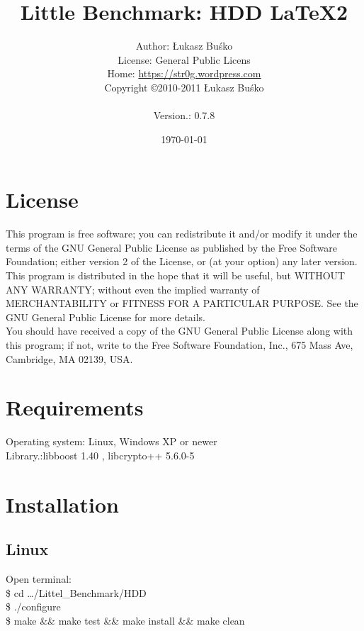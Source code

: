 \documentclass[a4paper]{article}
\begin{document}
\title{Little Benchmark: HDD  \LaTeX2}
\author{Author: Łukasz Buśko
\\License: General Public Licens
\\Home:  \href{https://str0g.wordpress.com}{https://str0g.wordpress.com}
\\Copyright \copyright 2010-2011 Łukasz Buśko\\
\date{\today} Version.: 0.7.8}
\maketitle
\newpage
\tableofcontents
\newpage
\section{License}

    This program is free software; you can redistribute it and/or modify
    it under the terms of the GNU General Public License as published by
    the Free Software Foundation; either version 2 of the License, or
    (at your option) any later version.\\

    This program is distributed in the hope that it will be useful,
    but WITHOUT ANY WARRANTY; without even the implied warranty of
    MERCHANTABILITY or FITNESS FOR A PARTICULAR PURPOSE.  See the
    GNU General Public License for more details.\\

    You should have received a copy of the GNU General Public License
    along with this program; if not, write to the Free Software
    Foundation, Inc., 675 Mass Ave, Cambridge, MA 02139, USA.
    
\section{Requirements}
Operating system: Linux, Windows XP or newer\\
Library.:libboost 1.40 , libcrypto++ 5.6.0-5
\section{Installation}
\subsection{Linux}
Open terminal:\\
\$ cd \ldots/Littel\_Benchmark/HDD\\
\$ ./configure\\
\$ make \&\& make test \&\& make install \&\& make clean\\
\end{document}
